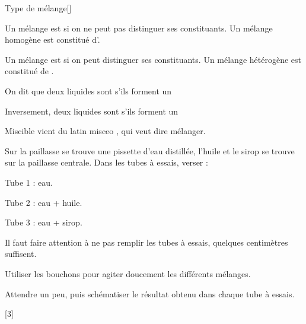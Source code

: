 \begin{doc}{Type de mélange}[\label{doc:type_melange}]
  \begin{importants}
    Un mélange est  si on ne peut pas distinguer ses constituants.
    Un mélange homogène est constitué d'.
  \end{importants}
  
  \begin{importants}
    Un mélange est  si on peut distinguer ses constituants.
    Un mélange hétérogène est constitué de .
  \end{importants}

  \begin{importants}
    On dit que deux liquides sont  s'ils forment un 
  \end{importants}
  \begin{importants}
    Inversement, deux liquides sont  s'ils forment un 
  \end{importants}
  Miscible vient du latin \og misceo \fg, qui veut dire mélanger.
\end{doc}


\mesure
Sur la paillasse se trouve une pissette d'eau distillée, l'huile et le sirop se trouve sur la paillasse centrale.
Dans les tubes à essais, verser :
\begin{listePoints}[3]
  \item Tube 1 : eau.
  \item Tube 2 : eau + huile.
  \item Tube 3 : eau + sirop.
\end{listePoints}

\attention Il faut faire attention à ne pas remplir les tubes à essais, quelques centimètres suffisent.

\mesure 
Utiliser les bouchons pour agiter doucement les différents mélanges.

%
\newpage
\vspace*{-24pt}
\schematisation Attendre un peu, puis schématiser le résultat obtenu dans chaque tube à essais.
\pasCorrection{\vspace*{6cm}}

%
[3]

